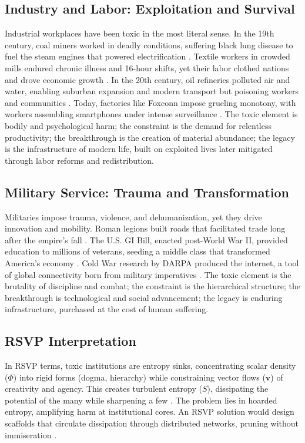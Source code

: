 \documentclass[12pt]{article}
\begin{document}
\subsection{Industry and Labor: Exploitation and Survival}
Industrial workplaces have been toxic in the most literal sense. In the 19th century, coal miners worked in deadly conditions, suffering black lung disease to fuel the steam engines that powered electrification \citep{he2024apple}. Textile workers in crowded mills endured chronic illness and 16-hour shifts, yet their labor clothed nations and drove economic growth \citep{graeber2021dawn}. In the 20th century, oil refineries polluted air and water, enabling suburban expansion and modern transport but poisoning workers and communities \citep{he2024apple}. Today, factories like Foxconn impose grueling monotony, with workers assembling smartphones under intense surveillance \citep{zuboff2019age}. The toxic element is bodily and psychological harm; the constraint is the demand for relentless productivity; the breakthrough is the creation of material abundance; the legacy is the infrastructure of modern life, built on exploited lives later mitigated through labor reforms and redistribution.

\subsection{Military Service: Trauma and Transformation}
Militaries impose trauma, violence, and dehumanization, yet they drive innovation and mobility. Roman legions built roads that facilitated trade long after the empire’s fall \citep{graeber2021dawn}. The U.S. GI Bill, enacted post-World War II, provided education to millions of veterans, seeding a middle class that transformed America’s economy \citep{graeber2021dawn}. Cold War research by DARPA produced the internet, a tool of global connectivity born from military imperatives \citep{zuboff2019age}. The toxic element is the brutality of discipline and combat; the constraint is the hierarchical structure; the breakthrough is technological and social advancement; the legacy is enduring infrastructure, purchased at the cost of human suffering.

\subsection{RSVP Interpretation}
In RSVP terms, toxic institutions are entropy sinks, concentrating scalar density ($\Phi$) into rigid forms (dogma, hierarchy) while constraining vector flows ($\mathbf{v}$) of creativity and agency. This creates turbulent entropy ($S$), dissipating the potential of the many while sharpening a few \citep{hesse1969glass}. The problem lies in hoarded entropy, amplifying harm at institutional cores. An RSVP solution would design scaffolds that circulate dissipation through distributed networks, pruning without immiseration \citep{doctorow2023internet}.
\end{document}
